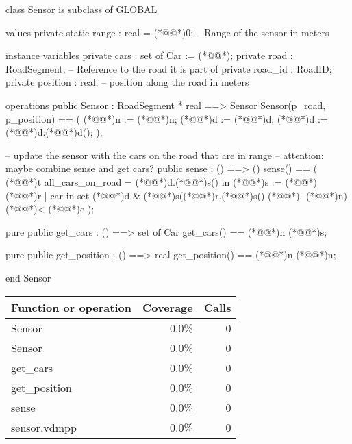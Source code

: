 \documentclass[a4paper]{article}
\begin{document}
\title{}
\author{}
\begin{vdm_al}
class Sensor is subclass of GLOBAL

values
    private static range : real = (*@@*)0; -- Range of the sensor in meters

instance variables
    private cars : set of Car := (*@\vdmnotcovered{}@*){};
    private road : RoadSegment; -- Reference to the road it is part of
    private road_id : RoadID;
    private position : real; -- position along the road in meters

operations
    public Sensor : RoadSegment * real ==> Sensor
    Sensor(p_road, p_position) == (
        (*@@*)n := (*@@*)n;
        (*@@*)d := (*@@*)d;
        (*@@*)d := (*@@*)d.(*@@*)d();
    );

    -- update the sensor with the cars on the road that are in range
    -- attention: maybe combine sense and get cars?
    public sense : () ==> ()
    sense() == (
        (*@@*)t all_cars_on_road = (*@@*)d.(*@@*)s() in
            (*@@*)s := (*@\vdmnotcovered{}@*){ (*@@*)r | car in set (*@@*)d & (*@@*)s((*@@*)r.(*@@*)s() (*@\vdmnotcovered{}@*)- (*@@*)n) (*@\vdmnotcovered{}@*)< (*@@*)e }
    );

    pure public get_cars : () ==> set of Car
    get_cars() == (*@@*)n (*@@*)s;

    pure public get_position : () ==> real
    get_position() == (*@@*)n (*@@*)n;

end Sensor
\end{vdm_al}
\bigskip
\begin{longtable}{|l|r|r|}
\hline
Function or operation & Coverage & Calls \\
\hline
\hline
Sensor & 0.0\% & 0 \\
\hline
Sensor & 0.0\% & 0 \\
\hline
get\_cars & 0.0\% & 0 \\
\hline
get\_position & 0.0\% & 0 \\
\hline
sense & 0.0\% & 0 \\
\hline
\hline
sensor.vdmpp & 0.0\% & 0 \\
\hline
\end{longtable}
\end{document}
